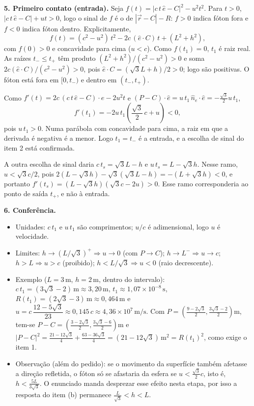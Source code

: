 \documentclass{article}%
\begin{document}
\textbf{5. Primeiro contato (entrada).} Seja $f(t)=|c\,t\,\hat e-C|^2-u^2t^2$. Para $t>0$, $|c\,t\,\hat e-C|+ut>0$, logo o sinal de $f$ é o de $|\vec r-C|-R$: $f>0$ indica fóton fora e $f<0$ indica fóton dentro. Explicitamente,
\[
f(t)=(c^2-u^2)\,t^2-2c\,(\hat e\cdot C)\,t+(L^2+h^2),
\]
com $f(0)>0$ e concavidade para cima ($u<c$). Como $f(t_1)=0$, $t_1$ é raiz real. As raízes $t_-\leq t_+$ têm produto $(L^2+h^2)/(c^2-u^2)>0$ e soma $2c(\hat e\cdot C)/(c^2-u^2)>0$, pois $\hat e\cdot C=(\sqrt3L+h)/2>0$; logo são positivas. O fóton está fora em $[0,t_-)$ e dentro em $(t_-,t_+)$.

Como $f'(t)=2c\,(c\,t\,\hat e-C)\cdot\hat e-2u^2t$ e $(P-C)\cdot\hat e=u\,t_1\,\hat n_e\cdot\hat e=-\tfrac{\sqrt3}{2}u\,t_1$,
\[
f'(t_1)=-2u\,t_1\left(\frac{\sqrt3}{2}\,c+u\right)<0,
\]
pois $u\,t_1>0$. Numa parábola com concavidade para cima, a raiz em que a derivada é negativa é a menor. Logo $t_1=t_-$ é a entrada, e a escolha de sinal do item 2 está confirmada.

A outra escolha de sinal daria $c\,t_s=\sqrt3L-h$ e $u\,t_s=L-\sqrt3h$. Nesse ramo, $u<\sqrt3c/2$, pois $2(L-\sqrt3h)-\sqrt3(\sqrt3L-h)=-(L+\sqrt3h)<0$, e portanto $f'(t_s)=(L-\sqrt3h)(\sqrt3c-2u)>0$. Esse ramo corresponderia ao ponto de saída $t_+$, e não à entrada.

\textbf{6. Conferência.}
\begin{itemize}
\item Unidades: $c\,t_1$ e $u\,t_1$ são comprimentos; $u/c$ é adimensional, logo $u$ é velocidade.
\item Limites: $h\to(L/\sqrt3)^+\Rightarrow u\to0$ (com $P\to C$); $h\to L^-\Rightarrow u\to c$; $h>L\Rightarrow u>c$ (proibido); $h<L/\sqrt3\Rightarrow u<0$ (raio decrescente).
\item Exemplo ($L=3\,\text{m}$, $h=2\,\text{m}$, dentro do intervalo): $c\,t_1=(3\sqrt3-2)\,\text{m}\approx3{,}20\,\text{m}$, $t_1\approx1{,}07\times10^{-8}\,\text{s}$, $R(t_1)=(2\sqrt3-3)\,\text{m}\approx0{,}464\,\text{m}$ e $u=c\,\dfrac{12-5\sqrt3}{23}\approx0{,}145\,c\approx4{,}36\times10^{7}\,\text{m/s}$. Com $P=\left(\frac{9-2\sqrt3}{2},\frac{3\sqrt3-2}{2}\right)\text{m}$, tem-se $P-C=\left(\frac{3-2\sqrt3}{2},\frac{3\sqrt3-6}{2}\right)\text{m}$ e $|P-C|^2=\frac{21-12\sqrt3}{4}+\frac{63-36\sqrt3}{4}=(21-12\sqrt3)\,\text{m}^2=R(t_1)^2$, como exige o item 1.
\item Observação (além do pedido): se o movimento da superfície também afetasse a direção refletida, o fóton só se afastaria da esfera se $u<\frac{\sqrt3}{2}c$, isto é, $h<\frac{5L}{3\sqrt3}$. O enunciado manda desprezar esse efeito nesta etapa, por isso a resposta do item (b) permanece $\frac{L}{\sqrt3}<h<L$.
\end{itemize}
\end{document}

